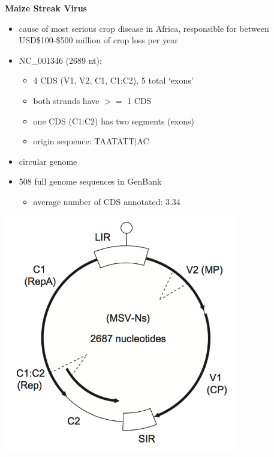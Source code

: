 \documentclass[landscape]{slides}
\begin{document}
\begin{slide}
\begin{center}
\textbf{Maize Streak Virus}

\begin{minipage}[c]{6in}
\tiny
\begin{itemize}
\item cause of most serious crop disease in Africa, responsible for
  between USD\$100-\$500 million of crop loss per year
\item NC\_001346 (2689 nt):
  \begin{itemize}
    \item 4 CDS (V1, V2, C1, C1:C2), 5 total ‘exons’
    \item both strands have $>=$ 1 CDS
    \item one CDS (C1:C2) has two segments (exons)
    \item origin sequence: TAATATT$|$AC
  \end{itemize}
\item circular genome
\item 508 full genome sequences in GenBank
\begin{itemize}
  \item average number of CDS annotated: 3.34
\end{itemize}
\end{itemize}
\vspace{3in}
\end{minipage}
\begin{minipage}[c]{4in}
\includegraphics[width=4in]{figs/msv-genome-small}
\vspace{3in}
\end{minipage}

\vfill
\end{center}
\end{slide}
\end{document}
